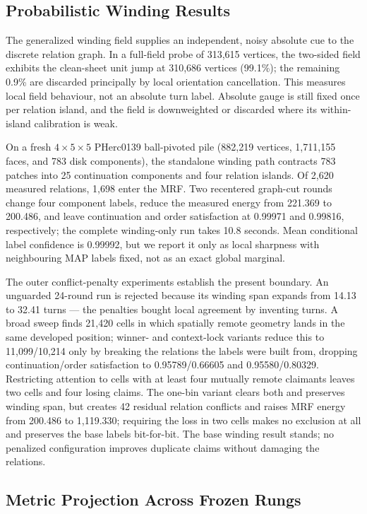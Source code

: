\subsection{Probabilistic Winding Results}

The generalized winding field supplies an independent, noisy absolute cue to the discrete relation graph. In a full-field probe of 313,615 vertices, the two-sided field exhibits the clean-sheet unit jump at 310,686 vertices (99.1\%); the remaining 0.9\% are discarded principally by local orientation cancellation. This measures local field behaviour, not an absolute turn label. Absolute gauge is still fixed once per relation island, and the field is downweighted or discarded where its within-island calibration is weak.

On a fresh $4\times5\times5$ PHerc0139 ball-pivoted pile (882,219 vertices, 1,711,155 faces, and 783 disk components), the standalone winding path contracts 783 patches into 25 continuation components and four relation islands. Of 2,620 measured relations, 1,698 enter the MRF. Two recentered graph-cut rounds change four component labels, reduce the measured energy from 221.369 to 200.486, and leave continuation and order satisfaction at 0.99971 and 0.99816, respectively; the complete winding-only run takes 10.8 seconds. Mean conditional label confidence is 0.99992, but we report it only as local sharpness with neighbouring MAP labels fixed, not as an exact global marginal.

The outer conflict-penalty experiments establish the present boundary. An unguarded 24-round run is rejected because its winding span expands from 14.13 to 32.41 turns --- the penalties bought local agreement by inventing turns. A broad sweep finds 21,420 cells in which spatially remote geometry lands in the same developed position; winner- and context-lock variants reduce this to 11,099/10,214 only by breaking the relations the labels were built from, dropping continuation/order satisfaction to 0.95789/0.66605 and 0.95580/0.80329. Restricting attention to cells with at least four mutually remote claimants leaves two cells and four losing claims. The one-bin variant clears both and preserves winding span, but creates 42 residual relation conflicts and raises MRF energy from 200.486 to 1,119.330; requiring the loss in two cells makes no exclusion at all and preserves the base labels bit-for-bit. The base winding result stands; no penalized configuration improves duplicate claims without damaging the relations.

\subsection{Metric Projection Across Frozen Rungs}

